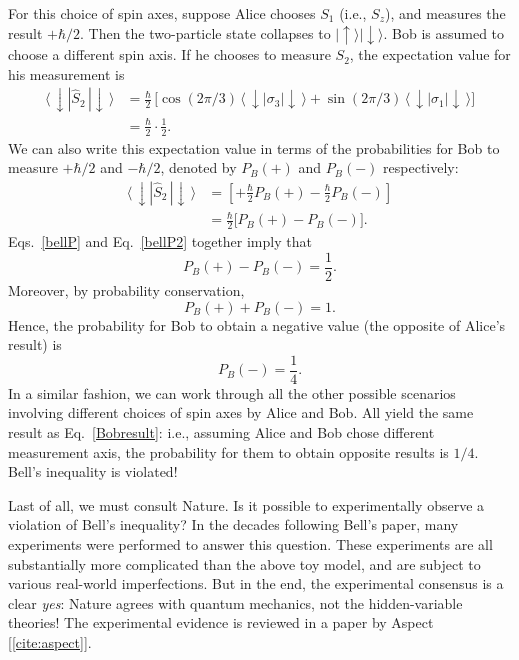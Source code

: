 \documentclass[prx,12pt]{revtex4-2}
\begin{document}
For this choice of spin axes, suppose Alice chooses $S_1$ (i.e.,
$S_z$), and measures the result $+\hbar/2$.  Then the two-particle
state collapses to $|\!\uparrow\rangle |\!\downarrow\rangle$.  Bob is
assumed to choose a different spin axis.  If he chooses to measure
$S_2$, the expectation value for his measurement is
\begin{align}
  \langle\,\downarrow | \hat{S}_2 \,|\!\downarrow\,\rangle
  &= \frac{\hbar}{2} \,
  \Big[\cos(2\pi/3) \, \langle\,\downarrow|\sigma_3| \downarrow\,\rangle
    + \sin(2\pi/3)\, \langle\,\downarrow|\sigma_1|\downarrow\,\rangle\Big]\\
  &= \frac{\hbar}{2} \cdot \frac{1}{2}.
  \label{bellP}
\end{align}
We can also write this expectation value in terms of the probabilities
for Bob to measure $+\hbar/2$ and $-\hbar/2$, denoted by $P_B(+)$ and
$P_B(-)$ respectively:
\begin{align}
  \langle\,\downarrow | \hat{S}_2 \,|\!\downarrow\,\rangle
  &= \left[+\frac{\hbar}{2} P_B(+) - \frac{\hbar}{2} P_B(-)\right] \\
  &= \frac{\hbar}{2} \Big[P_B(+) - P_B(-)\Big].
  \label{bellP2}
\end{align}
Eqs.~\eqref{bellP} and Eq.~\eqref{bellP2} together imply that
\begin{equation}
  P_B(+) - P_B(-) = \frac{1}{2}.
\end{equation}
Moreover, by probability conservation,
\begin{equation}
  P_B(+) + P_B(-) = 1.
\end{equation}
Hence, the probability for Bob to obtain a negative value (the
opposite of Alice's result) is
\begin{equation}
  P_B(-) = \frac{1}{4}.
  \label{Bobresult}
\end{equation}
In a similar fashion, we can work through all the other possible
scenarios involving different choices of spin axes by Alice and Bob.
All yield the same result as Eq.~\eqref{Bobresult}: i.e., assuming
Alice and Bob chose different measurement axis, the probability for
them to obtain opposite results is $1/4$.  Bell's inequality is
violated!

Last of all, we must consult Nature.  Is it possible to experimentally
observe a violation of Bell's inequality?  In the decades following
Bell's paper, many experiments were performed to answer this question.
These experiments are all substantially more complicated than the
above toy model, and are subject to various real-world imperfections.
But in the end, the experimental consensus is a clear \textit{yes}:
Nature agrees with quantum mechanics, not the hidden-variable
theories!  The experimental evidence is reviewed in a paper by Aspect
[\ref{cite:aspect}].
\end{document}
